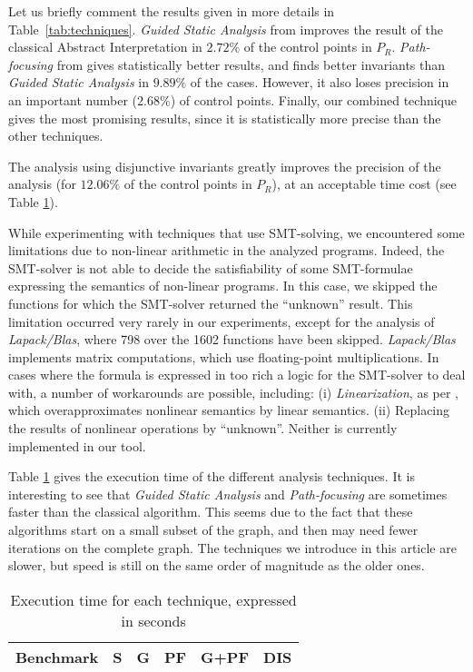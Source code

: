 \documentclass{entcs}
\begin{document}
Let us briefly comment the results given in more details in Table~\ref{tab:techniques}.
\emph{Guided Static Analysis} from \citet{DBLP:conf/sas/GopanR07} improves the
result of the classical Abstract Interpretation in $2.72\%$ of the control points
in $P_R$.
\emph{Path-focusing} from \citet{Monniaux_Gonnord_SAS11} gives
statistically better results, and finds better invariants than \emph{Guided
Static Analysis} in $9.89\%$ of the cases. However, it also loses precision in an
important number ($2.68\%$) of control points.
Finally, our combined technique gives the most promising results, since it is
statistically more precise than the other techniques.

The analysis using disjunctive invariants greatly improves the
precision of the analysis (for $12.06\%$ of the control points in $P_R$), at an
acceptable time cost (see Table \ref{tab:time}).

While experimenting with techniques that use SMT-solving, we encountered some
limitations due to non-linear arithmetic in the analyzed programs. Indeed, 
the SMT-solver is not able to decide the satisfiability of some SMT-formulae
expressing the semantics of non-linear programs. 
In this case, we skipped the functions for which the SMT-solver returned the
``unknown'' result.
This limitation occurred very rarely in our experiments, except for the analysis
of \emph{Lapack/Blas}, where 798 over the 1602 functions have been skipped.
\emph{Lapack/Blas} implements matrix computations, which use floating-point multiplications.
In cases where the formula is expressed in too rich a logic for the SMT-solver to deal with, a number of workarounds are possible, including:
(i) \emph{Linearization}, as per \citet{DBLP:conf/vmcai/Mine06}, which overapproximates nonlinear semantics by linear semantics.
(ii) Replacing the results of nonlinear operations by ``unknown''.
Neither is currently implemented in our tool.

Table \ref{tab:time} gives the execution time of the different analysis
techniques. It is interesting to see that \emph{Guided Static Analysis} and
\emph{Path-focusing} are sometimes faster than the classical
algorithm.
This seems due to the fact that these algorithms start on a small subset
of the graph, and then may need fewer iterations on the complete graph.
The techniques we introduce in this article are slower, but speed is still on the same order of magnitude as the older ones.

\begin{table}[!tb]
\begin{center}\small
\begin{tabular}{|l|r|r|r|r|r|} \hline
	\multicolumn{1}{|c|}{Benchmark} &
        \multicolumn{1}{c|}{\textbf{S}} &
        \multicolumn{1}{c|}{\textbf{G}} &
        \multicolumn{1}{c|}{\textbf{PF}} &
        \multicolumn{1}{c|}{\textbf{G+PF}} &
	\multicolumn{1}{c|}{\textbf{DIS}} \\ \hline
	 \hline
\end{tabular}
\end{center}
\caption{Execution time for each technique, expressed in seconds}
\label{tab:time}
\end{table}
\end{document}
